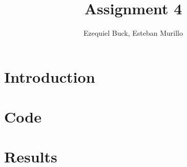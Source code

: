 \documentclass[12pt]{article}
\title{Assignment 4}
\author{Ezequiel Buck, Esteban Murillo}
\begin{document}
\maketitle

\section*{Introduction}

\section*{Code}

\section*{Results}
\end{document}
